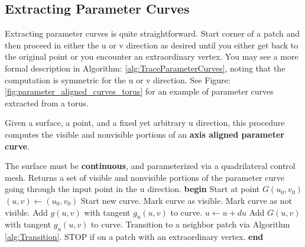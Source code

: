 \documentclass[12pt, letterpaper]{article}
\begin{document}
	\newpage

	\subsection{Extracting Parameter Curves}

		Extracting parameter curves is quite straightforward. Start corner of a patch and then proceed in either the u or v direction as desired until you either get back to the original point or you encounter an extraordinary vertex.
		You may see a more formal description in Algorithm: \ref{alg:TraceParameterCurves}, noting that the computation is symmetric for the u or v direction.
		See Figure: \ref{fig:parameter_aligned_curves_torus} for an example of parameter curves extracted from a torus.

		\begin{algorithm}                      %
		\caption{Given a surface, a point, and a fixed yet arbitrary u direction, this procedure computes the visible and nonvisible portions of an \textbf{axis aligned parameter curve}.}
		\label{alg:TraceParameterCurves}       %
		\begin{algorithmic}                    %
			\REQUIRE The surface must be \textbf{continuous}, and parameterized via a quadrilateral control mesh.
			\ENSURE Returns a set of visible and nonvisible portions of the parameter curve going through the input point in the u direction.
			\STATE \textbf{begin}
				\STATE Start at point $G(u_{0}, v_{0})$
				\STATE $(u, v) \leftarrow (u_{0}, v_{0})$
			\REPEAT
				\STATE Start new curve.
				\STATE Mark curve as visible.
				\ELSE
				\STATE Mark curve as not visible.
				\ENDIF
				\STATE Add $g(u, v)$ with tangent $g_{u}(u, v)$ to curve.
				\REPEAT
				\STATE $u \leftarrow u + du$
				\STATE Add $G(u, v)$ with tangent $g_{u}(u, v)$ to curve.
				\STATE Transition to a neighbor patch via Algorithm \ref{alg:Transition}.
				\STATE STOP if on a patch with an extraordinary vertex.
				\ENDIF
			\STATE \textbf{end}
		\end{algorithmic}
		\end{algorithm}
\end{document}
